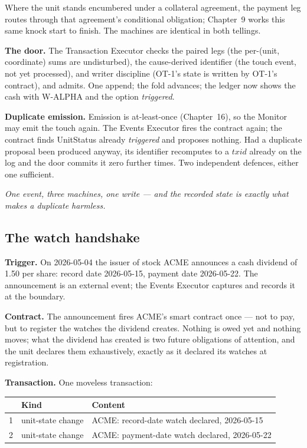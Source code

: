 \documentclass[11pt,a4paper]{article}
\begin{document}
Where the unit stands encumbered under a collateral agreement, the payment leg
routes through that agreement's conditional obligation; Chapter~9 works this
same knock start to finish. The machines are identical in both tellings.

\textbf{The door.} The Transaction Executor checks the paired legs (the
per-(unit, coordinate) sums are undisturbed), the cause-derived identifier (the
touch event, not yet processed), and writer discipline (OT-1's state is written
by OT-1's contract), and admits. One append; the fold advances; the ledger now
shows the cash with \mbox{W-ALPHA} and the option \emph{triggered}.

\textbf{Duplicate emission.} Emission is at-least-once (Chapter~16), so the
Monitor may emit the touch again. The Events Executor fires the contract again;
the contract finds UnitStatus already \emph{triggered} and proposes nothing.
Had a duplicate proposal been produced anyway, its identifier recomputes to a
$\mathit{txid}$ already on the log and the door commits it zero further times. Two
independent defences, either one sufficient.

\emph{One event, three machines, one write --- and the recorded state is
exactly what makes a duplicate harmless.}

\subsection{The watch handshake}

\textbf{Trigger.} On 2026-05-04 the issuer of stock ACME announces a cash
dividend of 1.50 per share: record date 2026-05-15, payment date 2026-05-22.
The announcement is an external event; the Events Executor captures and records
it at the boundary.

\textbf{Contract.} The announcement fires ACME's smart contract once --- not to
pay, but to register the watches the dividend creates. Nothing is owed yet and
nothing moves; what the dividend has created is two future obligations of
attention, and the unit declares them exhaustively, exactly as it declared its
watches at registration.

\textbf{Transaction.} One moveless transaction:

\begin{center}
\begin{tabular}{@{}rll@{}}
\toprule
 & Kind & Content \\
\midrule
1 & unit-state change & ACME: record-date watch declared, 2026-05-15 \\
2 & unit-state change & ACME: payment-date watch declared, 2026-05-22 \\
\bottomrule
\end{tabular}
\end{center}
\end{document}
